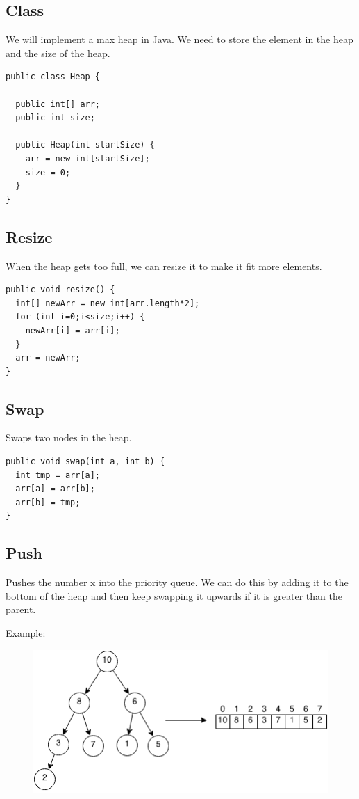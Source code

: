 \documentclass[11pt,oneside]{book}
\makeatletter
\def\maxwidth#1{\ifdim\Gin@nat@width>#1 #1\else\Gin@nat@width\fi}
\makeatother
\begin{document}
\subsection{Class}

We will implement a max heap in Java. We need to store the element in the heap and the size of the heap.

\begin{lstlisting}
public class Heap {

  public int[] arr;
  public int size;

  public Heap(int startSize) {
    arr = new int[startSize];
    size = 0;
  }
}
\end{lstlisting}

\subsection{Resize}

When the heap gets too full, we can resize it to make it fit more elements.

\begin{lstlisting}
public void resize() {
  int[] newArr = new int[arr.length*2];
  for (int i=0;i<size;i++) {
    newArr[i] = arr[i];
  }
  arr = newArr;
}
\end{lstlisting}

\subsection{Swap}

Swaps two nodes in the heap.

\begin{lstlisting}
public void swap(int a, int b) {
  int tmp = arr[a];
  arr[a] = arr[b];
  arr[b] = tmp;
}
\end{lstlisting}

\subsection{Push}

Pushes the number x into the priority queue. We can do this by adding it to the bottom of the heap and then keep swapping it upwards if it is greater than the parent.

Example:

\vspace{5px}\begin{figure}[H]\centering
        \includegraphics[width=0.66\maxwidth{\textwidth}]{maxheap.png}
        \end{figure}
\end{document}
